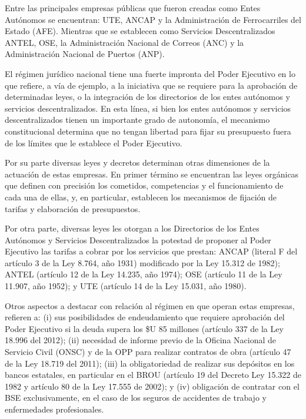 \documentclass[
  12pt,
  spanish,
]{book}
\begin{document}
Entre las principales empresas públicas que fueron creadas como Entes
Autónomos se encuentran: UTE, ANCAP y la Administración de Ferrocarriles
del Estado (AFE). Mientras que se establecen como Servicios
Descentralizados ANTEL, OSE, la Administración Nacional de Correos (ANC)
y la Administración Nacional de Puertos (ANP).

El régimen jurídico nacional tiene una fuerte impronta del Poder
Ejecutivo \citep{Bergara2005} en lo que refiere, a vía de ejemplo, a la
iniciativa que se requiere para la aprobación de determinadas leyes, o
la integración de los directorios de los entes autónomos y servicios
descentralizados. En esta línea, si bien los entes autónomos y servicios
descentralizados tienen un importante grado de autonomía, el mecanismo
constitucional determina que no tengan libertad para fijar su
presupuesto fuera de los límites que le establece el Poder Ejecutivo.

Por su parte diversas leyes y decretos determinan otras dimensiones de
la actuación de estas empresas. En primer término se encuentran las
leyes orgánicas que definen con precisión los cometidos, competencias y
el funcionamiento de cada una de ellas, y, en particular, establecen los
mecanismos de fijación de tarifas y elaboración de presupuestos.

Por otra parte, diversas leyes les otorgan a los Directorios de los
Entes Autónomos y Servicios Descentralizados la potestad de proponer al
Poder Ejecutivo las tarifas a cobrar por los servicios que prestan:
ANCAP (literal F del artículo 3 de la Ley 8.764, año 1931) modificado
por la Ley 15.312 de 1982); ANTEL (artículo 12 de la Ley 14.235, año
1974); OSE (artículo 11 de la Ley 11.907, año 1952); y UTE (artículo 14
de la Ley 15.031, año 1980).

Otros aspectos a destacar con relación al régimen en que operan estas
empresas, refieren a: (i) sus posibilidades de endeudamiento que
requiere aprobación del Poder Ejecutivo si la deuda supera los \$U 85
millones (artículo 337 de la Ley 18.996 del 2012); (ii) necesidad de
informe previo de la Oficina Nacional de Servicio Civil (ONSC) y de la
OPP para realizar contratos de obra (artículo 47 de la Ley 18.719 del
2011); (iii) la obligatoriedad de realizar sus depósitos en los bancos
estatales, en particular en el BROU (artículo 19 del Decreto Ley 15.322
de 1982 y artículo 80 de la Ley 17.555 de 2002); y (iv) obligación de
contratar con el BSE exclusivamente, en el caso de los seguros de
accidentes de trabajo y enfermedades profesionales.
\end{document}
